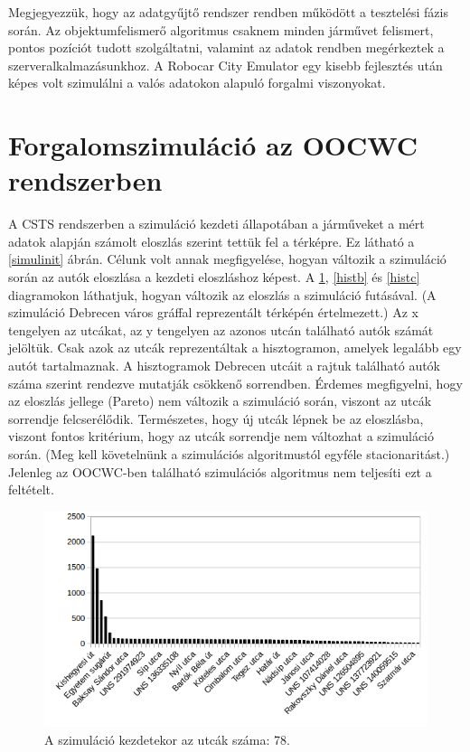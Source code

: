 \documentclass[a4paper,12pt]{report}
\begin{document}
Megjegyezzük, hogy az adatgyűjtő rendszer rendben működött a tesztelési fázis során. Az objektumfelismerő algoritmus csaknem minden járművet felismert, pontos pozíciót tudott szolgáltatni, valamint az adatok rendben megérkeztek a szerveralkalmazásunkhoz. A Robocar City Emulator egy kisebb fejlesztés után képes volt szimulálni a valós adatokon alapuló forgalmi viszonyokat. 

\section{Forgalomszimuláció az OOCWC rendszerben}

A CSTS rendszerben a szimuláció kezdeti állapotában a járműveket a mért adatok alapján számolt eloszlás szerint tettük fel a térképre. Ez látható a \ref{simulinit} ábrán. Célunk volt annak megfigyelése, hogyan változik a szimuláció során az autók eloszlása a kezdeti eloszláshoz képest. A \ref{hista}, \ref{histb} és \ref{histc} diagramokon láthatjuk, hogyan változik az eloszlás a szimuláció futásával. (A szimuláció Debrecen város gráffal reprezentált térképén értelmezett.) Az x tengelyen az utcákat, az y tengelyen az azonos utcán található autók számát jelöltük. Csak azok az utcák reprezentáltak a hisztogramon, amelyek legalább egy autót tartalmaznak. A hisztogramok Debrecen utcáit a rajtuk található autók száma szerint rendezve mutatják csökkenő sorrendben. Érdemes megfigyelni, hogy az eloszlás jellege (Pareto) nem változik a szimuláció során, viszont az utcák sorrendje felcserélődik. Természetes, hogy új utcák lépnek be az eloszlásba, viszont fontos kritérium, hogy az utcák sorrendje nem változhat a szimuláció során. (Meg kell követelnünk a szimulációs algoritmustól egyféle stacionaritást.) Jelenleg az OOCWC-ben található szimulációs algoritmus nem teljesíti ezt a feltételt.

\begin{figure}[h]
\centerline{
\includegraphics[scale=.8]{img/a1}}
\caption{A szimuláció kezdetekor az utcák száma: 78.}
\label{hista}
\end{figure}
\end{document}
